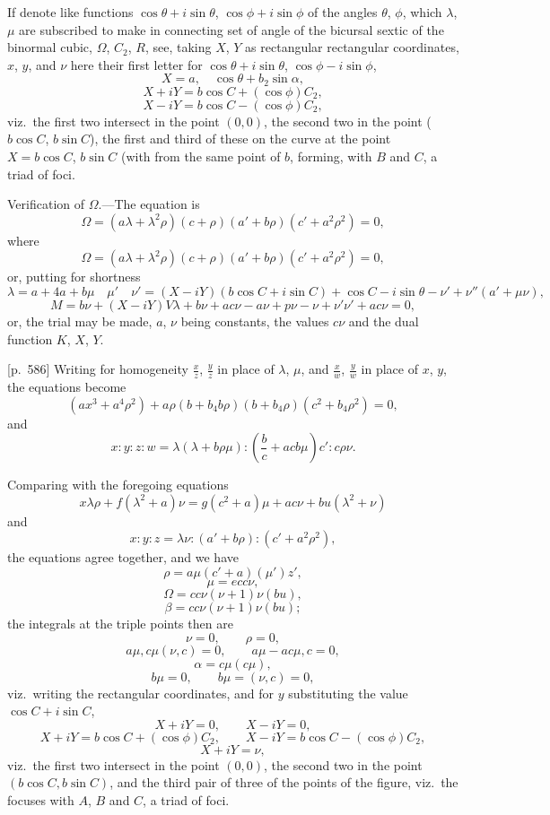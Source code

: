 \documentclass[11pt,a4paper]{article}
\theoremstyle{plain}
\theoremstyle{definition}
\theoremstyle{remark}
\begin{document}
If denote like functions $\cos \theta + i\sin \theta$, $\cos \phi + i\sin \phi$ of the angles $\theta$, $\phi$, which $\lambda$, $\mu$ are subscribed to make in connecting set of angle of the bicursal sextic of the binormal cubic, $\Omega$, $C_2$, $R$, see, taking $X$, $Y$ as rectangular rectangular coordinates, $x$, $y$, and $\nu$ here their first letter for $\cos \theta + i\sin \theta$, $\cos \phi - i\sin \phi$,
\[
X = a, \quad \cos \theta + b_2\sin \alpha,
\]
\[
X + iY = b\cos C + (\cos \phi)C_2,
\]
\[
X - iY = b\cos C - (\cos \phi)C_2,
\]
viz.\ the first two intersect in the point $(0, 0)$, the second two in the point ($b\cos C$, $b\sin C$), the first and third of these on the curve at the point $X = b\cos C$, $b\sin C$ (with from the same point of $b$, forming, with $B$ and $C$, a triad of foci.

Verification of $\Omega$.---The equation is
\[
\Omega = (a\lambda + \lambda^2\rho)(c + \rho)(a' + b\rho)(c' + a^2\rho^2) = 0,
\]
where
\[
\Omega = (a\lambda + \lambda^2\rho)(c + \rho)(a' + b\rho)(c' + a^2\rho^2) = 0,
\]
or, putting for shortness
\[
\lambda = a + 4a + b\mu \quad\mu' \quad\nu' = (X - i Y)(b\cos C + i\sin C) + \cos C - i\sin\theta - \nu' + \nu''(a' + \mu\nu),
\]
\[
M = b\nu + (X - iY)V\lambda + b\nu + a c\nu - a\nu + p\nu - \nu + \nu'\nu' + a c\nu = 0,
\]
or, the trial may be made, $a$, $\nu$ being constants, the values $c\nu$ and the dual function $K$, $X$, $Y$.

\bigskip

[p.~586] Writing for homogeneity $\frac{x}{z}$, $\frac{y}{z}$ in place of $\lambda$, $\mu$, and $\frac{x}{w}$, $\frac{y}{w}$ in place of $x$, $y$, the equations become
\[
(a x^3 + a^4 \rho^2) + a \rho(b + b_4 b\rho)(b + b_4 \rho)(c^2 + b_4 \rho^2) = 0,
\]
and
\[
x : y : z : w = \lambda(\lambda + b\rho\mu): \left(\frac{b}{c} + a c b\mu\right)c': c\rho\nu.
\]

Comparing with the foregoing equations
\[
x \lambda \rho + f(\lambda^2 + a)\nu = g(c^2 + a)\mu + a c\nu + b u(\lambda^2 + \nu)
\]
and
\[
x : y : z = \lambda\nu : (a' + b\rho): (c' + a^2\rho^2),
\]
the equations agree together, and we have
\[
\rho = a\mu(c' + a)(\mu')z',
\]
\[
\mu = e c c\nu,
\]
\[
\Omega = c c\nu(\nu + 1)\nu(b u),
\]
\[
\beta = c c\nu(\nu + 1)\nu(b u);
\]
the integrals at the triple points then are
\[
\nu = 0, \qquad \rho = 0,
\]
\[
a\mu, c\mu(\nu, c) = 0, \qquad a\mu - a c\mu, c = 0,
\]
\[
\alpha = c\mu(c\mu),
\]
\[
b\mu = 0, \qquad b\mu = (\nu, c) = 0,
\]
viz.\ writing the rectangular coordinates, and for $y$ substituting the value $\cos C + i\sin C$,
\[
X + iY = 0, \qquad X - iY = 0,
\]
\[
X + iY = b\cos C + (\cos \phi)C_2, \qquad X - iY = b\cos C - (\cos \phi)C_2,
\]
\[
X + iY = \nu,
\]
viz.\ the first two intersect in the point $(0, 0)$, the second two in the point $(b\cos C, b\sin C)$, and the third pair of three of the points of the figure, viz.\ the focuses with $A$, $B$ and $C$, a triad of foci.
\end{document}
